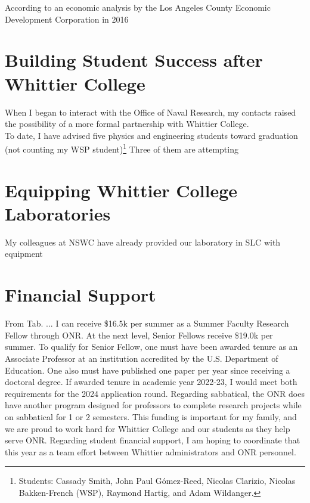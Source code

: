 \documentclass[../../../main.tex]{subfiles}
\begin{document}
\label{sec:naval_collaboration}

According to an economic analysis by the Los Angeles County Economic Development Corporation in 2016

\section{Building Student Success after Whittier College}

When I began to interact with the Office of Naval Research, my contacts raised the possibility of a more formal partnership with Whittier College.
\\
\vspace{0.25cm}
To date, I have advised five physics and engineering students toward graduation (not counting my WSP student)\footnote{Students: Cassady Smith, John Paul G\'{o}mez-Reed, Nicolas Clarizio, Nicolas Bakken-French (WSP), Raymond Hartig, and Adam Wildanger.}  Three of them are attempting 
 
\section{Equipping Whittier College Laboratories}

My colleagues at NSWC have already provided our laboratory in SLC with equipment
\section{Financial Support}

From Tab. ... I can receive \$16.5k per summer as a Summer Faculty Research Fellow through ONR.  At the next level, Senior Fellows receive \$19.0k per summer.  To qualify for Senior Fellow, one must have been awarded tenure as an Associate Professor at an institution accredited by the U.S. Department of Education.  One also must have published one paper per year since receiving a doctoral degree.  If awarded tenure in academic year 2022-23, I would meet both requirements for the 2024 application round.  Regarding sabbatical, the ONR does have another program designed for professors to complete research projects while on sabbatical for 1 or 2 semesters.  This funding is important for my family, and we are proud to work hard for Whittier College and our students as they help serve ONR.  Regarding student financial support, I am hoping to coordinate that this year as a team effort between Whittier administrators and ONR personnel.
\end{document}
